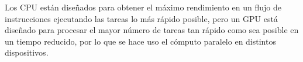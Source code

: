 Los CPU están diseñados para obtener el máximo rendimiento en un flujo de instrucciones ejecutando las tareas lo más rápido posible, pero un GPU está diseñado para procesar el mayor número de tareas tan rápido como sea posible en un tiempo reducido, por lo que se hace uso el cómputo paralelo en distintos dispositivos.




